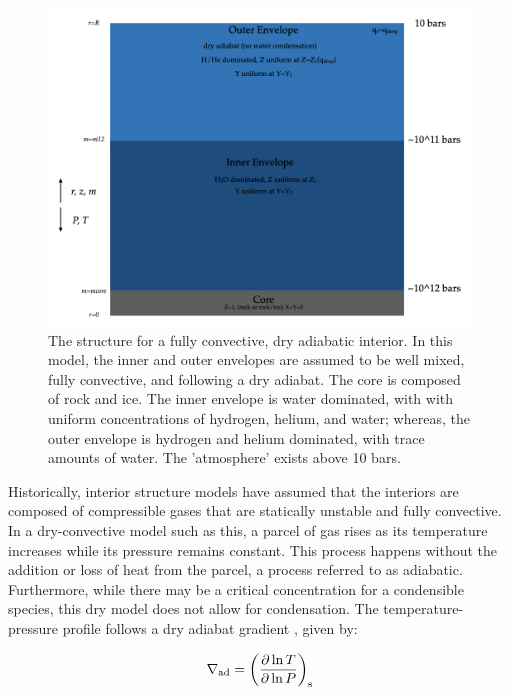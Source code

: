 \documentclass[11pt]{ucscthesisbs}
\begin{document}
\begin{figure}[ht!]
 \centerline{
  \includegraphics[width=6.0in]{figures/structure_schematic_images/structure_schematic_images.001.png}
 }
\caption[A Standard Interior Structure Model]
{The structure for a fully convective, dry adiabatic interior. In this model, the inner and outer envelopes are assumed to be well mixed, fully convective, and following a dry adiabat. The core is composed of rock and ice. The inner envelope is water dominated, with with uniform concentrations of hydrogen, helium, and water; whereas, the outer envelope is hydrogen and helium dominated, with trace amounts of water. The 'atmosphere' exists above 10 bars.}
\label{fig:standard_dry_interior}
\end{figure}

Historically, interior structure models have assumed that the interiors are composed of compressible gases that are statically unstable and fully convective. In a dry-convective model such as this, a parcel of gas rises as its temperature increases while its pressure remains constant. This process happens without the addition or loss of heat from the parcel, a process referred to as adiabatic. Furthermore, while there may be a critical concentration for a condensible species, this dry model does not allow for condensation. The temperature-pressure profile follows a dry adiabat gradient \citep{kippenhahn_2012}, given by:

\begin{equation}
  \nabla_{\rm ad} = \left( \frac{\partial \ln T}{\partial \ln P} \right)_{\rm s}
\end{equation}
\end{document}
